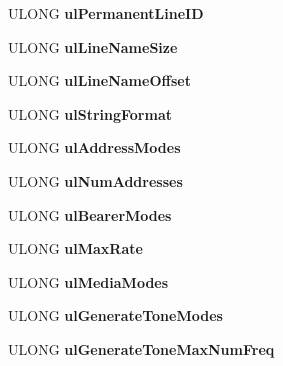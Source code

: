 \begin{DoxyCompactItemize}
U\+L\+O\+NG {\bfseries ul\+Permanent\+Line\+ID}
\item 
\mbox{\label{struct___l_i_n_e___d_e_v___c_a_p_s_a4dfd643caf482e5625b92d0d29e52c1e}} 
U\+L\+O\+NG {\bfseries ul\+Line\+Name\+Size}
\item 
\mbox{\label{struct___l_i_n_e___d_e_v___c_a_p_s_ad25bd4e7e5f7d6832f37599980f0b6df}} 
U\+L\+O\+NG {\bfseries ul\+Line\+Name\+Offset}
\item 
\mbox{\label{struct___l_i_n_e___d_e_v___c_a_p_s_a6014622b14ced406661d1e0bf8d6bce3}} 
U\+L\+O\+NG {\bfseries ul\+String\+Format}
\item 
\mbox{\label{struct___l_i_n_e___d_e_v___c_a_p_s_a8717b159a23c0760028e4b9b6a2c6c86}} 
U\+L\+O\+NG {\bfseries ul\+Address\+Modes}
\item 
\mbox{\label{struct___l_i_n_e___d_e_v___c_a_p_s_a48487f7dfe8917c5c7f33243b4deb10c}} 
U\+L\+O\+NG {\bfseries ul\+Num\+Addresses}
\item 
\mbox{\label{struct___l_i_n_e___d_e_v___c_a_p_s_a87ac5311bae76c7e3ffcebc2c9d4ed1a}} 
U\+L\+O\+NG {\bfseries ul\+Bearer\+Modes}
\item 
\mbox{\label{struct___l_i_n_e___d_e_v___c_a_p_s_a116ba9cef0e1630c03f95c86f5e6c412}} 
U\+L\+O\+NG {\bfseries ul\+Max\+Rate}
\item 
\mbox{\label{struct___l_i_n_e___d_e_v___c_a_p_s_a8b6d42e9db4e6396026263cfe9cc7e81}} 
U\+L\+O\+NG {\bfseries ul\+Media\+Modes}
\item 
\mbox{\label{struct___l_i_n_e___d_e_v___c_a_p_s_aa4f7b1a72bc785b08db982852d8367e9}} 
U\+L\+O\+NG {\bfseries ul\+Generate\+Tone\+Modes}
\item 
\mbox{\label{struct___l_i_n_e___d_e_v___c_a_p_s_af1bbaa88d13db58648c4df328a8eee3d}} 
U\+L\+O\+NG {\bfseries ul\+Generate\+Tone\+Max\+Num\+Freq}

\end{DoxyCompactItemize}
